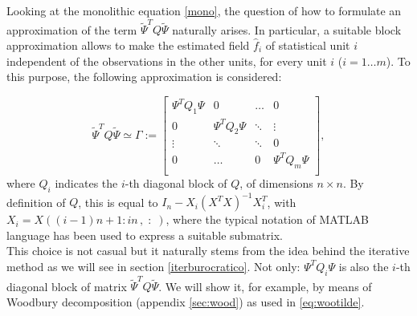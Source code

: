 Looking at the monolithic equation \ref{mono}, the question of how to formulate
an approximation of the term $\tilde{\Psi}^TQ\tilde{\Psi}$ naturally arises. In
particular, a suitable block approximation allows to make the estimated field
$\hat{f}_i$ of statistical unit $i$ independent of the observations in the
other units, for every unit $i$ ($i = 1 \dots m$). To this purpose, the
following approximation is considered:

\begin{equation}
	\label{blockdia}
	\tilde{\Psi}^TQ\tilde{\Psi}\simeq \Gamma :=
	\begin{bmatrix}
		\Psi^TQ_1\Psi & 0             & \dots  & 0             \\
		0             & \Psi^TQ_2\Psi & \ddots & \vdots        \\
		\vdots        & \ddots        & \ddots & 0             \\
		0             & \dots         & 0      & \Psi^TQ_m\Psi \\
	\end{bmatrix}
	,
\end{equation}
where $Q_i$ indicates the $i$-th diagonal block of $Q$, of dimensions
$n \times n$. By definition of $Q$, this is equal to
$I_n-X_i\left(X^TX\right)^{-1}X_i^T$, with $X_i=X\left(\left(i-1\right)n+1 :
	in\,, \;:\; \right)$, where the typical notation of MATLAB language has been
used to express a suitable submatrix.\\ This choice is not casual but it
naturally stems from the idea behind the iterative method as we will see in
section \ref{iterburocratico}. Not only: $\Psi^TQ_i\Psi$ is also the $i$-th
diagonal block of matrix $\tilde{\Psi}^TQ\tilde{\Psi}$. We will show it, for
example, by means of Woodbury decomposition (appendix \ref{sec:wood}) as used
in \ref{eq:wootilde}.

